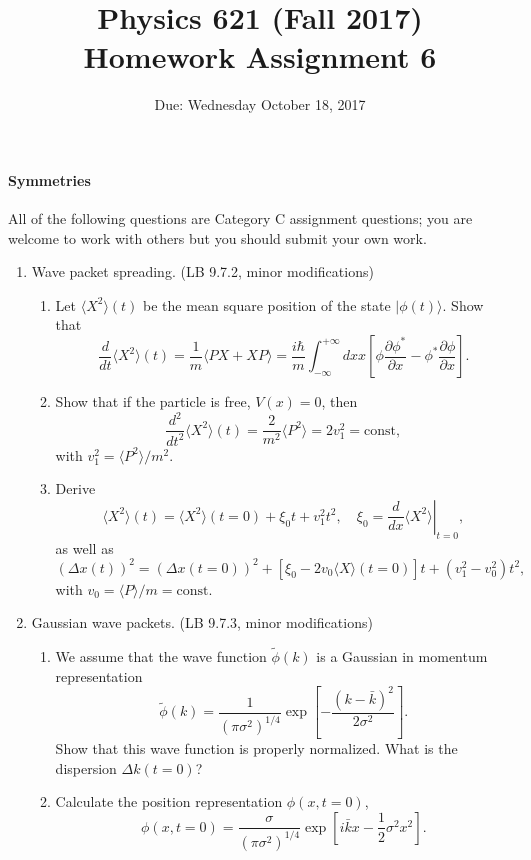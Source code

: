 \documentclass[letterpaper,11pt]{article}
\title{Physics 621 (Fall 2017) \\ Homework Assignment 6}
\date{Due: Wednesday October 18, 2017}
\begin{document}
\maketitle

\paragraph*{Symmetries}

All of the following questions are Category C assignment questions; you are welcome to work with others but you should submit your own work.

\begin{enumerate}
  \item Wave packet spreading. (LB 9.7.2, minor modifications)
  \begin{enumerate}
    \item Let $\langle X^2 \rangle(t)$ be the mean square position of the state $|\phi(t)\rangle$. Show that
    $$ \frac{d}{dt} \langle X^2 \rangle(t) = \frac{1}{m} \langle PX + XP \rangle = \frac{i\hbar}{m} \int_{-\infty}^{+\infty} dx x \left[ \phi \frac{\partial \phi^*}{\partial x} - \phi^* \frac{\partial \phi}{\partial x} \right]. $$
    \item Show that if the particle is free, $V(x) = 0$, then
    $$ \frac{d^2}{dt^2} \langle X^2 \rangle(t) = \frac{2}{m^2} \langle P^2 \rangle = 2 v_1^2 = \mbox{const}, $$
    with $v_1^2 = \langle P^2 \rangle / m^2$.
    \item Derive
    $$ \langle X^2 \rangle(t) = \langle X^2 \rangle(t = 0) + \xi_0 t + v_1^2 t^2, \quad \xi_0 = \left. \frac{d}{dx} \langle X^2 \rangle\right|_{t = 0}, $$
    as well as
    $$ \left(\Delta x(t)\right)^2 = \left(\Delta x(t = 0)\right)^2 + \left[ \xi_0 - 2 v_0 \langle X \rangle (t = 0) \right] t + (v_1^2 - v_0^2) t^2, $$
    with $v_0 = \langle P \rangle / m = \mbox{const}$.
  \end{enumerate}
  \item Gaussian wave packets. (LB 9.7.3, minor modifications)
  \begin{enumerate}
    \item We assume that the wave function $\tilde\phi(k)$ is a Gaussian in momentum representation
    $$ \tilde\phi(k) = \frac{1}{(\pi \sigma^2)^{1/4}} \exp \left[ -\frac{(k-\bar{k})^2}{2 \sigma^2} \right]. $$
    Show that this wave function is properly normalized. What is the dispersion $\Delta k(t = 0)$?
    \item Calculate the position representation $\phi(x,t=0)$,
    $$ \phi(x,t = 0) = \frac{\sigma}{(\pi \sigma^2)^{1/4}} \exp \left[ i \bar{k} x - \frac{1}{2} \sigma^2 x^2 \right]. $$

\end{enumerate}
\end{enumerate}
\end{document}

